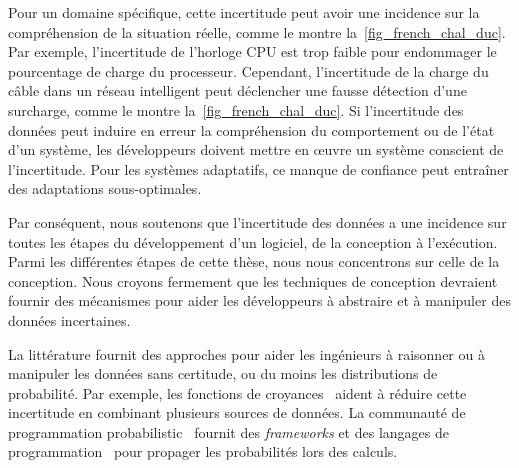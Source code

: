 %
Pour un domaine spécifique, cette incertitude peut avoir une incidence sur la compréhension de la situation réelle, comme le montre la~\cref{fig_french_chal_duc}. 
Par exemple, l'incertitude de l'horloge CPU est trop faible pour endommager le pourcentage de charge du processeur. 
Cependant, l'incertitude de la charge du câble dans un réseau intelligent peut déclencher une fausse détection d'une surcharge, comme le montre la~\cref{fig_french_chal_duc}. 
Si l'incertitude des données peut induire en erreur la compréhension du comportement ou de l'état d'un système, les développeurs doivent mettre en œuvre un système conscient de l'incertitude. 
Pour les systèmes adaptatifs, ce manque de confiance peut entraîner des adaptations sous-optimales.

%
Par conséquent, nous soutenons que l'incertitude des données a une incidence sur toutes les étapes du développement d'un logiciel, de la conception à l'exécution.
Parmi les différentes étapes de cette thèse, nous nous concentrons sur celle de la conception.
Nous croyons fermement que les techniques de conception devraient fournir des mécanismes pour aider les développeurs à abstraire et à manipuler des données incertaines.

%
La littérature fournit des approches pour aider les ingénieurs à raisonner ou à manipuler les données sans certitude, ou du moins les distributions de probabilité.
Par exemple, les fonctions de croyances~\cite{shafer1992dempster} aident à réduire cette incertitude en combinant plusieurs sources de données.
La communauté de programmation probabilistic~\cite{DBLP:conf/icse/GordonHNR14} fournit des \textit{frameworks} et des langages de programmation~\cite{url:InferNET18, baudin2017openturns} pour propager les probabilités lors des calculs.

